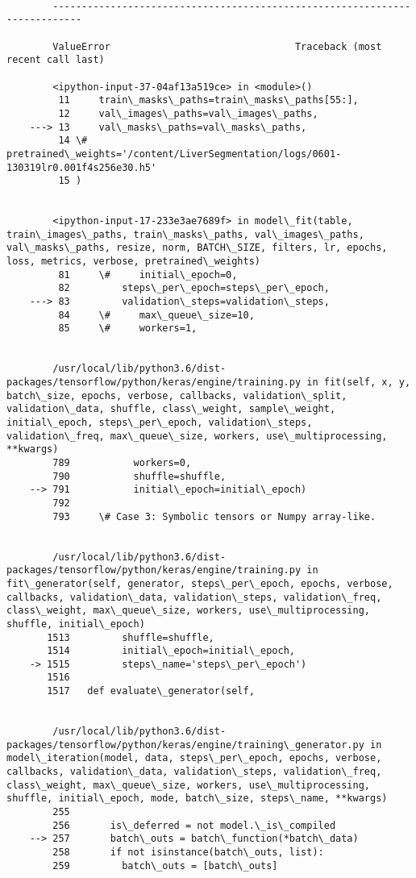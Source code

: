 \documentclass[11pt]{article}
\begin{document}
    \begin{Verbatim}[commandchars=\\\{\}]

        ---------------------------------------------------------------------------

        ValueError                                Traceback (most recent call last)

        <ipython-input-37-04af13a519ce> in <module>()
         11     train\_masks\_paths=train\_masks\_paths[55:],
         12     val\_images\_paths=val\_images\_paths,
    ---> 13     val\_masks\_paths=val\_masks\_paths,
         14 \#     pretrained\_weights='/content/LiverSegmentation/logs/0601-130319lr0.001f4s256e30.h5'
         15 )


        <ipython-input-17-233e3ae7689f> in model\_fit(table, train\_images\_paths, train\_masks\_paths, val\_images\_paths, val\_masks\_paths, resize, norm, BATCH\_SIZE, filters, lr, epochs, loss, metrics, verbose, pretrained\_weights)
         81     \#     initial\_epoch=0,
         82         steps\_per\_epoch=steps\_per\_epoch,
    ---> 83         validation\_steps=validation\_steps,
         84     \#     max\_queue\_size=10,
         85     \#     workers=1,


        /usr/local/lib/python3.6/dist-packages/tensorflow/python/keras/engine/training.py in fit(self, x, y, batch\_size, epochs, verbose, callbacks, validation\_split, validation\_data, shuffle, class\_weight, sample\_weight, initial\_epoch, steps\_per\_epoch, validation\_steps, validation\_freq, max\_queue\_size, workers, use\_multiprocessing, **kwargs)
        789           workers=0,
        790           shuffle=shuffle,
    --> 791           initial\_epoch=initial\_epoch)
        792 
        793     \# Case 3: Symbolic tensors or Numpy array-like.


        /usr/local/lib/python3.6/dist-packages/tensorflow/python/keras/engine/training.py in fit\_generator(self, generator, steps\_per\_epoch, epochs, verbose, callbacks, validation\_data, validation\_steps, validation\_freq, class\_weight, max\_queue\_size, workers, use\_multiprocessing, shuffle, initial\_epoch)
       1513         shuffle=shuffle,
       1514         initial\_epoch=initial\_epoch,
    -> 1515         steps\_name='steps\_per\_epoch')
       1516 
       1517   def evaluate\_generator(self,


        /usr/local/lib/python3.6/dist-packages/tensorflow/python/keras/engine/training\_generator.py in model\_iteration(model, data, steps\_per\_epoch, epochs, verbose, callbacks, validation\_data, validation\_steps, validation\_freq, class\_weight, max\_queue\_size, workers, use\_multiprocessing, shuffle, initial\_epoch, mode, batch\_size, steps\_name, **kwargs)
        255 
        256       is\_deferred = not model.\_is\_compiled
    --> 257       batch\_outs = batch\_function(*batch\_data)
        258       if not isinstance(batch\_outs, list):
        259         batch\_outs = [batch\_outs]



\end{Verbatim}
\end{document}
